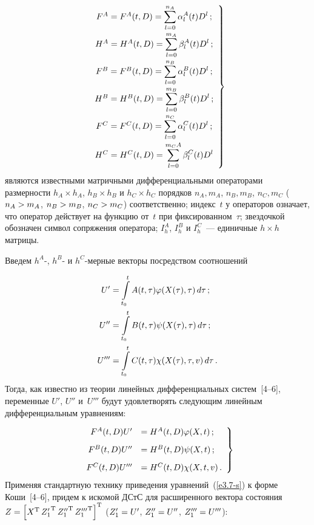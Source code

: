 \begin{multicols}{2}
\noindent
\begin{equation}
\left.
\begin{array}{c}
F^A = F^A (t,D)=\displaystyle\sum\limits_{l=0}^{n_A} \alpha_l^A (t) D^l\,;\\[12pt] 
H^A=H^A(t,D) =\displaystyle\sum\limits_{l=0}^{m_A} \beta_l^A (t) D^l\,;\\[12pt]
F^B = F^B (t,D)=\displaystyle\sum\limits_{l=0}^{n_B} \alpha_l^B (t) D^l\,;\\[12pt] 
H^B=H^B(t,D) =\displaystyle\sum\limits_{l=0}^{m_B} \beta_l^B (t) D^l\,;\\[12pt]
F^C = F^C (t,D)=\displaystyle\sum\limits_{l=0}^{n_C} \alpha_l^C (t) D^l\,;\\[12pt] 
H^C=H^C(t,D) =\displaystyle\sum\limits_{l=0}^{m_CA} \beta_l^C (t) D^l
   \end{array}
   \right\}
    \label{e3.3-s}
    \end{equation}
являются известными матричными дифференциальными операторами размерности  
$h_A\times h_A$, $h_B\times h_B$ и $h_C\times h_C$ порядков $n_A, m_A$,
$n_B, m_B$, $n_C, m_C$ ($n_A\hm>m_A$, $n_B\hm>m_B$, $n_C\hm>m_C$) 
соответственно; индекс~$t$ у операторов означает, что оператор действует на функцию 
от~$t$ при фиксированном~$\tau$; звездочкой обозначен символ сопряжения оператора; 
$I_h^A$, $I_h^B$ и $I_h^C$~--- единичные $h\times h$ матрицы.

Введем $h^A$-, $h^B$- и $h^C$-мер\-ные векторы посредством соотношений

\vspace*{-2pt}

\noindent
    \begin{align*}
    U' &=\iii_{t_0}^t A(t,\tau) \vrp(X(\tau), \tau)\,d\tau\,;%
    \\
    U'' &=\iii_{t_0}^t B(t,\tau) \psi(X(\tau), \tau)\,d\tau\,;\label{e3.5-s}
    \\
    U''' &=\iii_{t_0}^t C(t,\tau) \chi(X(\tau), \tau,v)\,d\tau\,. %
    \end{align*}
Тогда, как известно из теории линейных дифференциальных сис\-тем~[4--6], 
переменные  $U'$, $U''$ и~$U'''$ будут удовлетворять следующим линейным дифференциальным 
уравнениям:

\vspace*{2pt}

\noindent
\begin{equation}
\left.
\begin{array}{rl}
F^A(t, D) U' &= H^A (t, D) \varphi (X, t)\,;\\[9pt]
    F^B(t, D) U'' &= H^B (t, D) \psi (X, t)\,;\\[9pt]
F^C(t, D) U''' &= H^C (t, D) \chi (X, t,v)\,.
\end{array}
\right\}
\label{e3.7-s}
\end{equation}
Применяя стандартную технику приведения уравнений~(\ref{e3.7-s}) к форме Коши~[4--6], 
придем к искомой ДСтС для расширенного вектора состояния 
$Z\hm=\left[ X^{\mathrm{T}} \,{Z_1'}^{\mathrm{T}}\, 
{Z_1''}^{\mathrm{T}}\,{Z_1'''}^{\mathrm{T}}\right]^{\mathrm{T}}$ 
($Z_1' \hm= U'$, $Z_1''\hm= U''$, $Z_1'''\hm = U'''$):


\end{multicols}
